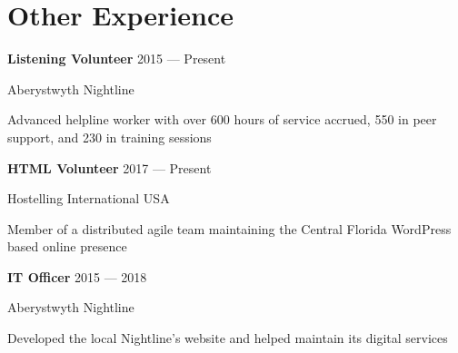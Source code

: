 \section{Other Experience}

\parbox[t][][t]{\linewidth}{
	\parbox{\linewidth}{\textbf{Listening Volunteer} \hfill {{2015 --- Present}}}
	\parbox{\linewidth}{Aberystwyth Nightline}
	\smallbreak
	\smallskip
	Advanced helpline worker with over 600 hours of service accrued, 550 in peer support, and 230 in training sessions
	\bigbreak
	\smallskip
}

\parbox[t][][t]{\linewidth}{
	\parbox{\linewidth}{\textbf{HTML Volunteer} \hfill {{2017 --- Present}}}
	\parbox{\linewidth}{Hostelling International USA}
	\smallbreak
	\smallskip
	Member of a distributed agile team maintaining the Central Florida WordPress based online presence
	\bigbreak
	\smallskip
}

\parbox[t][][t]{\linewidth}{
	\parbox{\linewidth}{\textbf{IT Officer} \hfill {{2015 --- 2018}}}
	\parbox{\linewidth}{Aberystwyth Nightline}
	\smallbreak
	\smallskip
	Developed the local Nightline's website and helped maintain its digital services
}
